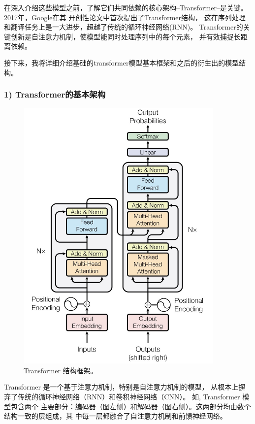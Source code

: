 在深入介绍这些模型之前，了解它们共同依赖的核心架构--Transformer--是关键。2017年，Google在其
开创性论文\cite{vaswani2017attention}中首次提出了Transformer结构，
这在序列处理和翻译任务上是一大进步，超越了传统的循环神经网络(RNN)。
Transformer的关键创新是自注意力机制，使模型能同时处理序列中的每个元素，
并有效捕捉长距离依赖。

接下来，我将详细介绍基础的transformer模型基本框架和之后的衍生出的模型结构。

\subsubsection*{1) Transformer的基本架构}

\begin{figure}[th]
  \centering\includegraphics[width=4in]{figures/xulun/transformer.jpg}
  \caption{Transformer 结构框架\cite{vaswani2017attention}。}
  \label{fig1:transformer}
  \end{figure}
  Transformer 是一个基于注意力机制，特别是自注意力机制的模型，
  从根本上摒弃了传统的循环神经网络（RNN）和卷积神经网络（CNN）。
  如, 
  Transformer 模型包含两个
  主要部分：编码器（图左侧）和解码器（图右侧）。这两部分均由数个结构一致的层组成，其
  中每一层都融合了自注意力机制和前馈神经网络。

